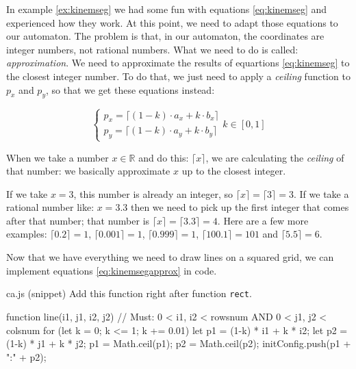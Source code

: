 In example \ref{ex:kinemseg} we had some fun with equations \ref{eq:kinemseg}
and experienced how they work. At this point, we need to adapt those equations to our automaton.
The problem is that, in our automaton, the coordinates are integer numbers, not rational
numbers. What we need to do is called: \textit{approximation}. We need to approximate
the results of equartions \ref{eq:kinemseg} to the closest integer number.
To do that, we just need to apply a \textit{ceiling} function to $p_x$ and $p_y$, so that we get
these equations instead:

\begin{equation}
\label{eq:kinemsegapprox}
\begin{cases}
p_x = \lceil (1-k) \cdot a_x + k \cdot b_x \rceil\\
p_y = \lceil (1-k) \cdot a_y + k \cdot b_y \rceil
\end{cases}
k \in [0,1]
\end{equation}

When we take a number $x \in \mathbb{R}$ and do this: $\lceil x \rceil$, we are calculating
the \textit{ceiling} of that number: we basically approximate $x$ up to the closest integer.

\begin{example}
If we take $x = 3$, this number is already an integer, so $\lceil x \rceil = \lceil 3 \rceil = 3$.
If we take a rational number like: $x = 3.3$ then we need to pick up the first integer that
comes after that number; that number is $\lceil x \rceil = \lceil 3.3 \rceil = 4$.
Here are a few more examples: $\lceil 0.2 \rceil = 1$, $\lceil 0.001 \rceil = 1$,
$\lceil 0.999 \rceil = 1$, $\lceil 100.1 \rceil = 101$ and $\lceil 5.5 \rceil = 6$.
\end{example}

Now that we have everything we need to draw lines on a squared grid, we can implement
equations \ref{eq:kinemsegapprox} in code.

\begin{programcode}{ca.js (snippet)}
Add this function right after function \texttt{rect}.
\begin{code}
function line(i1, j1, i2, j2) {
  // Must: 0 < i1, i2 < rowsnum AND 0 < j1, j2 < colsnum
  for (let k = 0; k <= 1; k += 0.01) {
    let p1 = (1-k) * i1 + k * i2;
    let p2 = (1-k) * j1 + k * j2;
    p1 = Math.ceil(p1);
    p2 = Math.ceil(p2);
    initConfig.push(p1 + ":" + p2);
  }
}
\end{code}
\end{programcode}

